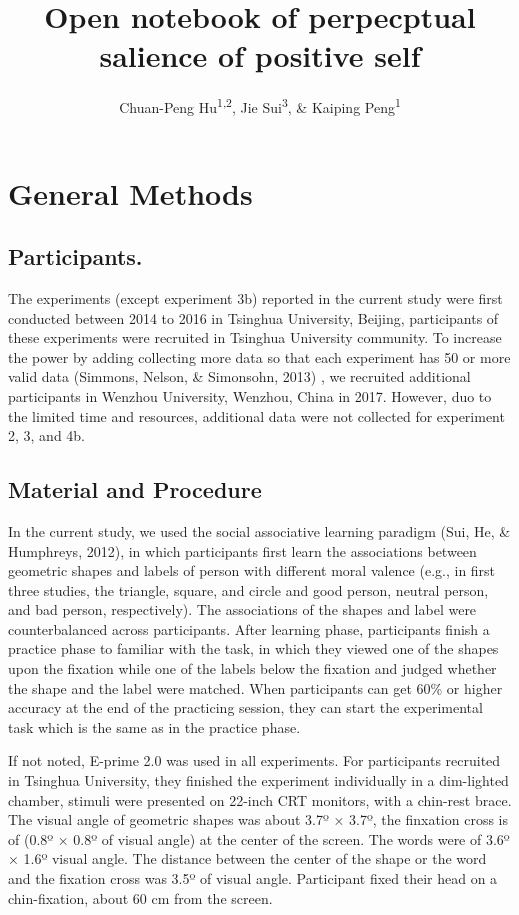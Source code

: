 \documentclass[man]{apa6}
\title{Open notebook of perpecptual salience of positive self}
\author{Chuan-Peng Hu\textsuperscript{1,2}, Jie Sui\textsuperscript{3}, \& Kaiping Peng\textsuperscript{1}}
\date{}
\affiliation{
\vspace{0.5cm}
\textsuperscript{1} Tsinghua University, 100084 Beijing, China\\\textsuperscript{2} German Resilience Center, 55131 Mainz, Germany\\\textsuperscript{3} University of Bath, Bath, UK}
\begin{document}
\maketitle

\hypertarget{general-methods}{%
\section{General Methods}\label{general-methods}}

\hypertarget{participants.}{%
\subsection{Participants.}\label{participants.}}

The experiments (except experiment 3b) reported in the current study were first conducted between 2014 to 2016 in Tsinghua University, Beijing, participants of these experiments were recruited in Tsinghua University community. To increase the power by adding collecting more data so that each experiment has 50 or more valid data (Simmons, Nelson, \& Simonsohn, 2013) , we recruited additional participants in Wenzhou University, Wenzhou, China in 2017. However, duo to the limited time and resources, additional data were not collected for experiment 2, 3, and 4b.

\hypertarget{material-and-procedure}{%
\subsection{Material and Procedure}\label{material-and-procedure}}

In the current study, we used the social associative learning paradigm (Sui, He, \& Humphreys, 2012), in which participants first learn the associations between geometric shapes and labels of person with different moral valence (e.g., in first three studies, the triangle, square, and circle and good person, neutral person, and bad person, respectively). The associations of the shapes and label were counterbalanced across participants. After learning phase, participants finish a practice phase to familiar with the task, in which they viewed one of the shapes upon the fixation while one of the labels below the fixation and judged whether the shape and the label were matched. When participants can get 60\% or higher accuracy at the end of the practicing session, they can start the experimental task which is the same as in the practice phase.

If not noted, E-prime 2.0 was used in all experiments. For participants recruited in Tsinghua University, they finished the experiment individually in a dim-lighted chamber, stimuli were presented on 22-inch CRT monitors, with a chin-rest brace. The visual angle of geometric shapes was about 3.7º × 3.7º, the finxation cross is of (0.8º × 0.8º of visual angle) at the center of the screen. The words were of 3.6º × 1.6º visual angle. The distance between the center of the shape or the word and the fixation cross was 3.5º of visual angle. Participant fixed their head on a chin-fixation, about 60 cm from the screen.
\end{document}
